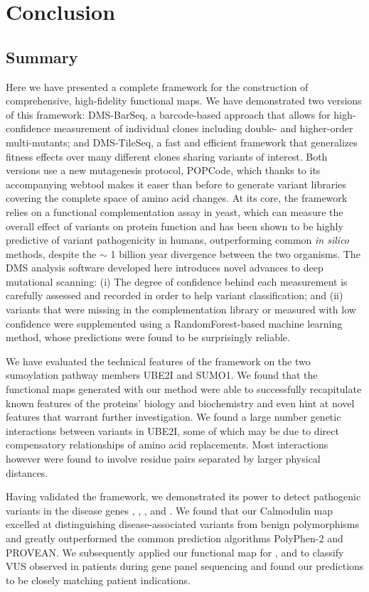 
\chapter{Conclusion}

\section{Summary}

Here we have presented a complete framework for the construction of comprehensive, high-fidelity functional maps. We have demonstrated two versions of this framework: DMS-BarSeq, a barcode-based approach that allows for high-confidence measurement of individual clones including double- and higher-order multi-mutants; and DMS-TileSeq, a fast and efficient framework that generalizes fitness effects over many different clones sharing variants of interest. Both versions use a new mutagenesis protocol, POPCode, which thanks to its accompanying webtool makes it easer than before to generate variant libraries covering the complete space of amino acid changes. At its core, the framework relies on a functional complementation assay in yeast, which can measure the overall effect of variants on protein function and has been shown to be highly predictive of variant pathogenicity in humans, outperforming common \textit{in silico} methods, despite the $\sim$ 1 billion year divergence between the two organisms. 
The DMS analysis software developed here introduces novel advances to deep mutational scanning: (i) The degree of confidence behind each measurement is carefully assessed and recorded in order to help variant classification; and (ii) variants that were missing in the complementation library or measured with low confidence were supplemented using a RandomForest-based machine learning method, whose predictions were found to be surprisingly reliable. 

We have evaluated the technical features of the framework on the two sumoylation pathway members UBE2I and SUMO1. We found that the functional maps generated with our method were able to successfully recapitulate known features of the proteins' biology and biochemistry and even hint at novel features that warrant further investigation. We found a large number genetic interactions between variants in UBE2I, some of which may be due to direct compensatory relationships of amino acid replacements. Most interactions however were found to involve residue pairs separated by larger physical distances.

Having validated the framework, we demonstrated its power to detect pathogenic variants in the disease genes , , ,  and .  
We found that our Calmodulin map excelled at distinguishing disease-associated variants from benign polymorphisms and greatly outperformed the common prediction algorithms PolyPhen-2 and PROVEAN. We subsequently applied our functional map for ,  and  to classify VUS observed in patients during gene panel sequencing and found our predictions to be closely matching patient indications.

